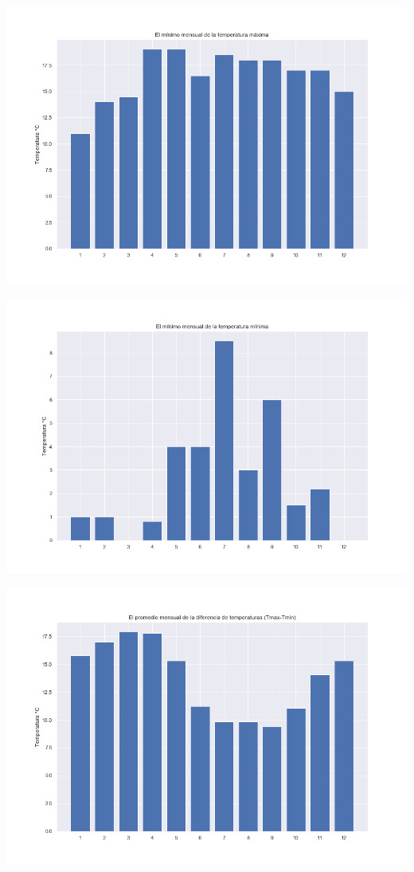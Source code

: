 \documentclass[12pt]{article}
\begin{document}
\begin{center}
\includegraphics[scale=0.5]{TXn.png}
\end{center} 
\begin{center}
\includegraphics[scale=0.5]{TNn.png}
\end{center} 
\begin{center}
\includegraphics[scale=0.5]{DTR.png}
\end{center} 
\end{document}
